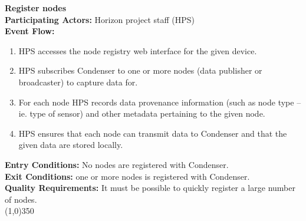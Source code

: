 		\textbf{Register nodes}	\\	 
		\textbf{Participating Actors:} Horizon project staff (HPS)  \\
		\textbf{Event Flow:}
		\begin{enumerate}
\item HPS accesses the node registry web interface for the given device. 
\item HPS subscribes Condenser to one or more nodes (data publisher or broadcaster) to capture data for.
\item For each node HPS records data provenance information (such as node type -- ie. type of sensor) and other metadata pertaining to the given node.
\item HPS ensures that each node can transmit data to Condenser and that the given data are stored locally.
	    \end{enumerate}
		\textbf{Entry Conditions:} No nodes are registered with Condenser.\\
		\textbf{Exit Conditions:} one or more nodes is registered with Condenser.\\
		\textbf{Quality Requirements:} It must be possible to quickly register a large number of nodes.\\
		\line(1,0){350}
